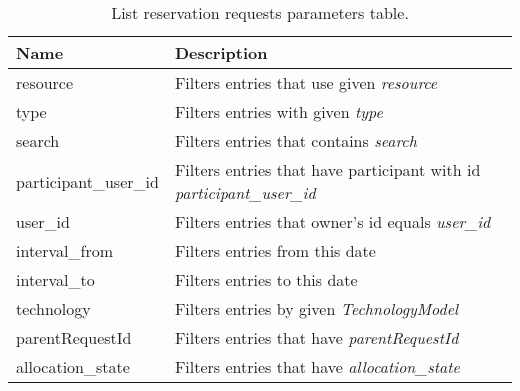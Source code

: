 \begin{table}[!ht]
    \begin{tabularx}{\textwidth}{lX}
        \toprule
        Name & Description \\
        \midrule
        resource & Filters entries that use given \emph{resource} \\
        type & Filters entries with given \emph{type} \\
        search & Filters entries that contains \emph{search} \\
        participant\_user\_id &  Filters entries that have participant with id \emph{participant\_user\_id} \\
        user\_id & Filters entries that owner's id equals \emph{user\_id} \\
        interval\_from & Filters entries from this date \\  
        interval\_to & Filters entries to this date \\
        technology & Filters entries by given \emph{TechnologyModel} \\
        parentRequestId & Filters entries that have \emph{parentRequestId} \\
        allocation\_state & Filters entries that have \emph{allocation\_state} \\
        \bottomrule
    \end{tabularx}
    \caption{List reservation requests parameters table.}
    \label{tab:res}
\end{table}

